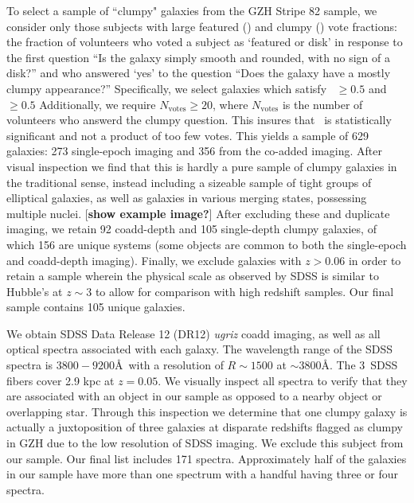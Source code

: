 To select a sample of ``clumpy" galaxies from the GZH Stripe 82 sample, we consider only those subjects with large featured (\ffeat) and clumpy (\fclump) vote fractions: the fraction of volunteers who voted a subject as `featured or disk' in response to the first question ``Is the galaxy simply smooth and rounded, with no sign of a disk?'' and who answered `yes' to the question ``Does the galaxy have a mostly clumpy appearance?'' Specifically, we select galaxies which satisfy \ffeat~$\ge0.5$ and \fclump~$\ge0.5$ Additionally, we require $N_{\mathrm{votes}} \ge 20$, where $N_{\mathrm{votes}}$ is the number of volunteers who answerd the clumpy question. This insures that \fclump~is statistically significant and not a product of too few votes.  This yields a sample of 629 galaxies: 273 single-epoch imaging and 356 from the co-added imaging. After visual inspection we find that this is hardly a pure sample of clumpy galaxies in the traditional sense, instead including a sizeable sample of tight groups of elliptical galaxies, as well as galaxies in various merging states, possessing multiple nuclei. [\textbf{show example image?}] After excluding these and duplicate imaging, we retain 92 coadd-depth and 105 single-depth clumpy galaxies, of which 156 are unique systems (some objects are common to both the single-epoch and coadd-depth imaging). Finally, we exclude galaxies with $z>0.06$ in order to retain a sample wherein the physical scale as observed by SDSS is similar to Hubble's at $z\sim3$ to allow for comparison with high redshift samples. Our final sample contains 105 unique galaxies. 


We obtain SDSS Data Release 12 (DR12) \textit{ugriz} coadd imaging, as well as all optical spectra associated with each galaxy. The wavelength range of the SDSS spectra is $3800-9200$\AA~with a resolution of $R\sim 1500$ at $\sim3800$\AA. The $3$\arcsec~SDSS fibers cover 2.9 kpc at $z=0.05$. We visually inspect all spectra to verify that they are associated with an object in our sample as opposed to a nearby object or overlapping star. Through this inspection we determine that one clumpy galaxy is actually a juxtoposition of three galaxies at disparate redshifts flagged as clumpy in GZH due to the low resolution of SDSS imaging. We exclude this subject from our sample. Our final list includes 171 spectra. Approximately half of the galaxies in our sample have more than one spectrum with a handful having three or four spectra.  

